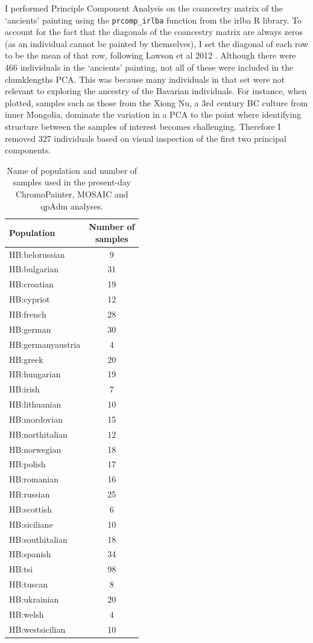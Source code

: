 I performed Principle Component Analysis on the coancestry matrix of the `ancients' painting using the \texttt{prcomp\_irlba} function from the irlba R library. To account for the fact that the diagonals of the coancestry matrix are always zeros (as an individual cannot be painted by themselves), I set the diagonal of each row to be the mean of that row, following Lawson et al 2012 \cite{Lawson2012}. Although there were 466 individuals in the `ancients' painting, not all of these were included in the chunklengths PCA. This was because many individuals in that set were not relevant to exploring the ancestry of the Bavarian individuals. For instance, when plotted, samples such as those from the Xiong Nu, a 3rd century BC culture from inner Mongolia, dominate the variation in a PCA to the point where identifying structure between the samples of interest becomes challenging. Therefore I removed 327 individuals based on visual inspection of the first two principal components.

\begin{table}
\centering
\begin{tabular}[t]{lc}
\toprule
Population & \thead{Number of\\samples}\\
\midrule
HB:belorussian & 9\\
HB:bulgarian & 31\\
HB:croatian & 19\\
HB:cypriot & 12\\
HB:french & 28\\
HB:german & 30\\
HB:germanyaustria & 4\\
HB:greek & 20\\
HB:hungarian & 19\\
HB:irish & 7\\
HB:lithuanian & 10\\
HB:mordovian & 15\\
HB:northitalian & 12\\
HB:norwegian & 18\\
HB:polish & 17\\
HB:romanian & 16\\
HB:russian & 25\\
HB:scottish & 6\\
HB:siciliane & 10\\
HB:southitalian & 18\\
HB:spanish & 34\\
HB:tsi & 98\\
HB:tuscan & 8\\
HB:ukrainian & 20\\
HB:welsh & 4\\
HB:westsicilian & 10\\
\bottomrule
\end{tabular}
\caption{Name of population and number of samples used in the present-day ChromoPainter, MOSAIC and qpAdm analyses.}
\label{tab:BavariaModernSamples}
\end{table}

